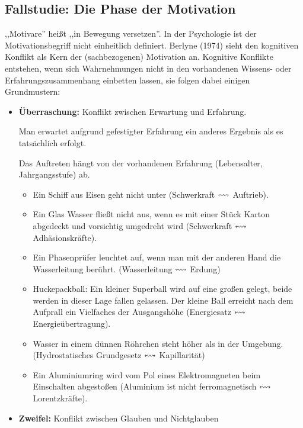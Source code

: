 \subsection{Fallstudie: Die Phase der Motivation}
,,Motivare'' hei{\ss}t ,,in Bewegung versetzen''.
In der Psychologie ist der Motivationsbegriff nicht einheitlich
definiert.
\bip
Berlyne (1974) sieht den kognitiven Konflikt als Kern der
(sachbezogenen) Motivation an.
Kognitive Konflikte entstehen, wenn sich Wahrnehmungen
nicht in den vorhandenen Wissens- oder Erfahrungszusammenhang
einbetten lassen, sie folgen dabei einigen Grundmustern:

\begin{itemize}
	\item {\bf \"{U}berraschung:}
	Konflikt zwischen Erwartung und Erfahrung.
	
	Man erwartet aufgrund gefestigter Erfahrung ein anderes
	Ergebnis als es tats\"{a}chlich erfolgt.
	
	Das Auftreten h\"{a}ngt von der vorhandenen Erfahrung
	(Lebensalter, Jahrgangsstufe) ab.
	\begin{beisp2}
		\begin{itemize}
		\item
		Ein Schiff aus Eisen geht nicht
		unter (Schwerkraft $\leftrightsquigarrow$ Auftrieb).
		\item
		Ein Glas Wasser flie{\ss}t nicht aus, wenn es mit einer St\"{u}ck
		Karton abgedeckt und vorsichtig umgedreht wird
		(Schwerkraft $\leftrightsquigarrow$ Adh\"{a}sionskr\"{a}fte).
		\item
		Ein Phasenpr\"{u}fer leuchtet auf, wenn man mit der anderen Hand
		die Wasserleitung ber\"{u}hrt. (Wasserleitung $\leftrightsquigarrow$ Erdung)
		\item
		Huckepackball: Ein kleiner Superball wird auf eine gro{\ss}en gelegt,
		beide werden in dieser Lage fallen gelassen.
		Der kleine Ball erreicht nach dem Aufprall ein
		Vielfaches der Ausgangsh\"{o}he
		(Energiesatz $\leftrightsquigarrow$ Energie\"{u}bertragung).
		\item
		Wasser in einem d\"{u}nnen R\"{o}hrchen steht h\"{o}her als in der Umgebung.
		(Hydrostatisches Grundgesetz $\leftrightsquigarrow$ Kapillarit\"{a}t)
		\item
		Ein Aluminiumring wird vom Pol eines Elektromagneten beim
		Einschalten abgesto{\ss}en
		(Aluminium ist nicht ferromagnetisch $\leftrightsquigarrow$ Lorentzkr\"{a}fte).
		\end{itemize}
	\end{beisp2}
	
	
	\item {\bf Zweifel:} Konflikt zwischen Glauben und Nichtglauben
	

\end{itemize}
